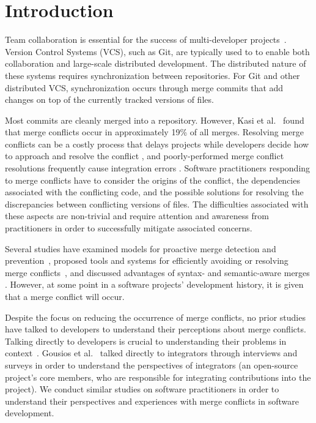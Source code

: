 \section{Introduction}\label{introduction}


Team collaboration is essential for the success of multi-developer projects~\cite{hattori2010syde}.
Version Control Systems (VCS), such as Git, are typically used to to enable both collaboration and large-scale distributed development.
The distributed nature of these systems requires synchronization between repositories.
For Git and other distributed VCS, synchronization occurs through merge commits that add changes on top of the currently tracked versions of files.

Most commits are cleanly merged into a repository.
However, Kasi et al.~\cite{cassandra} found that merge conflicts occur in approximately 19\% of all merges.
Resolving merge conflicts can be a costly process that delays projects while developers decide how to approach and resolve the conflict \cite{cassandra}, and poorly-performed merge conflict resolutions frequently cause integration errors \cite{bird-branches-conflict}.
Software practitioners responding to merge conflicts have to consider the origins of the conflict, the dependencies associated with the conflicting code, and the possible solutions for resolving the discrepancies between conflicting versions of files.
The difficulties associated with these aspects are non-trivial and require attention and awareness from practitioners in order to successfully mitigate associated concerns.

Several studies have examined models for proactive merge detection and prevention~\cite{Brun2011}\cite{palantir}\cite{Guimaraes}, proposed tools and systems for efficiently avoiding or resolving merge conflicts~\cite{nishimura}\cite{mens2002state}, and discussed advantages of syntax- and semantic-aware merges \cite{danny_refactorings}\cite{hunt2002extensible}. However, at some point in a software projects' development history, it is given that a merge conflict will occur. 

Despite the focus on reducing the occurrence of merge conflicts, no prior studies have talked to developers to understand their perceptions about merge conflicts.
Talking directly to developers is crucial to understanding their problems in context~\cite{fritz2010using, sillito2006questions, de2008answering, ko2007information}.
Gousios et al.~\cite{integrator_perspective} talked directly to integrators through interviews and surveys in order to understand the perspectives of integrators (an open-source project's core members, who are responsible for integrating contributions into the project).
We conduct similar studies on software practitioners in order to understand their perspectives and experiences with merge conflicts in software development.

